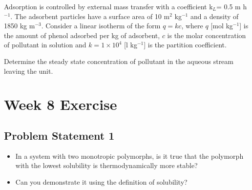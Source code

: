\documentclass[letterpaper,10pt,english]{jupyterBook}
\begin{document}
\sphinxAtStartPar
Adsorption is controlled by external mass transfer with a coefficient k\(_L\)= 0.5 m h\(^{-1}\).
The adsorbent particles have a surface area of 10 m\(^2\) kg\(^{-1}\) and a density of 1850 kg m\(^{-3}\).
Consider a linear isotherm of the form \(q=kc\), where \(q\) {[}mol kg\(^{-1}\){]} is the amount of phenol adsorbed per kg of adsorbent, \(c\) is the molar concentration of pollutant in solution and \(k=1\times{10}^4\) {[}l kg\(^{-1}\){]} is the partition coefficient.

\sphinxAtStartPar
Determine the steady state concentration of pollutant in the aqueous stream leaving the unit.

\sphinxstepscope


\section{Week 8 \sphinxhyphen{} Exercise}
\label{\detokenize{Exercise_W8_2021:week-8-exercise}}\label{\detokenize{Exercise_W8_2021::doc}}

\subsection{Problem Statement 1}
\label{\detokenize{Exercise_W8_2021:problem-statement-1}}\begin{itemize}
\item {} 
\sphinxAtStartPar
In a system with two monotropic polymorphs, is it true that the polymorph with the lowest solubility is thermodynamically more stable?

\item {} 
\sphinxAtStartPar
Can you demonstrate it using the definition of solubility?

\end{itemize}
\end{document}
